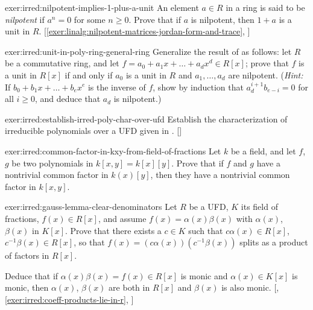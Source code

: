 \begin{exer}{}{exer:irred:nilpotent-implies-1-plus-a-unit}
  \exerused An element $a \in R$ in a ring is said to be
  \emph{nilpotent} if $a^n = 0$ for some $n \geq 0$. Prove that if $a$
  is nilpotent, then $1 + a$ is a unit in
  $R$. [\ref{exer:linalg:nilpotent-matrices-jordan-form-and-trace},
  ]
\end{exer}
\begin{exer}{}{exer:irred:unit-in-poly-ring-general-ring}
  Generalize the result of 
  as follows: let $R$ be a commutative ring, and let
  $f = a_0 + a_1 x + \dots + a_d x^d \in R[x]$; prove that $f$ is a
  unit in $R[x]$ if and only if $a_0$ is a unit in $R$ and
  $a_1, \dots, a_d$ are nilpotent. (\emph{Hint:} If
  $b_0 + b_1 x + \dots + b_e x^e$ is the inverse of $f$, show by
  induction that $a_d^{i+1} b_{e-i} = 0$ for all $i \geq 0$, and
  deduce that $a_d$ is nilpotent.)
\end{exer}
\begin{exer}{}{exer:irred:establish-irred-poly-char-over-ufd}
  \exerused Establish the characterization of irreducible polynomials
  over a UFD given in
  . []
\end{exer}
\begin{exer}{}{exer:irred:common-factor-in-kxy-from-field-of-fractions}
  Let $k$ be a field, and let $f$, $g$ be two polynomials in
  $k[x, y] = k[x][y]$. Prove that if $f$ and $g$ have a nontrivial
  common factor in $k(x)[y]$, then they have a nontrivial common
  factor in $k[x, y]$.
\end{exer}
\begin{exer}{}{exer:irred:gauss-lemma-clear-denominators}
  \exerused Let $R$ be a UFD, $K$ its field of fractions,
  $f(x) \in R[x]$, and assume $f(x) = \alpha(x)\beta(x)$ with
  $\alpha(x)$, $\beta(x)$ in $K[x]$. Prove that there exists a
  $c \in K$ such that $c\alpha(x) \in R[x]$,
  $c^{-1}\beta(x) \in R[x]$, so that
  $f(x) = (c\alpha(x))(c^{-1}\beta(x))$ splits as a product of factors
  in $R[x]$.

  Deduce that if $\alpha(x)\beta(x) = f(x) \in R[x]$ is monic and
  $\alpha(x) \in K[x]$ is monic, then $\alpha(x)$, $\beta(x)$ are both
  in $R[x]$ and $\beta(x)$ is also monic.
  [,
  \ref{exer:irred:coeff-products-lie-in-r},
  ]
\end{exer}
